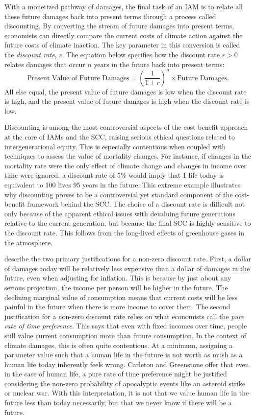 With a monetized pathway of damages, the final task of an IAM is to relate all these future damages back into present terms through a process called discounting. By converting the stream of future damages into present terms, economists can directly compare the current costs of climate action against the future costs of climate inaction. The key parameter in this conversion is called the \emph{discount rate}, $r$. The equation below specifies how the discount rate $r > 0$ relates damages that occur $n$ years in the future back into present terms:
\begin{equation*}
	\text{Present Value of Future Damages} = \left(\frac{1}{1 + r}\right)^n \times \text{Future Damages}.
\end{equation*}
All else equal, the present value of future damages is low when the discount rate is high, and the present value of future damages is high when the discount rate is low.

Discounting is among the most controversial aspects of the cost-benefit approach at the core of IAMs and the SCC, raising serious ethical questions related to intergenerational equity. This is especially contentious when coupled with techniques to assess the value of mortality changes. For instance, if changes in the mortality rate were the only effect of climate change and changes in income over time were ignored, a discount rate of 5\% would imply that 1 life today is equivalent to 100 lives 95 years in the future. This extreme example illustrates why discounting proves to be a controversial yet standard component of the cost-benefit framework behind the SCC. The choice of a discount rate is difficult not only because of the apparent ethical issues with devaluing future generations relative to the current generation, but because the final SCC is highly sensitive to the discount rate. This follows from the long-lived effects of greenhouse gases in the atmosphere.

\cite{carleton2022guide} describe the two primary justifications for a non-zero discount rate. First, a dollar of damages today will be relatively less expensive than a dollar of damages in the future, even when adjusting for inflation. This is because by just about any serious projection, the income per person will be higher in the future. The declining marginal value of consumption means that current costs will be less painful in the future when there is more income to cover them. The second justification for a non-zero discount rate relies on what economists call the \emph{pure rate of time preference}. This says that even with fixed incomes over time, people still value current consumption more than future consumption. In the context of climate damages, this is often quite contentious. At a minimum, assigning a parameter value such that a human life in the future is not worth as mush as a human life today inherently feels wrong. Carleton and Greenstone offer that even in the case of human life, a pure rate of time preference might be justified considering the non-zero probability of apocalyptic events like an asteroid strike or nuclear war. With this interpretation, it is not that we value human life in the future less than today necessarily, but that we never know if there will be a future. 

